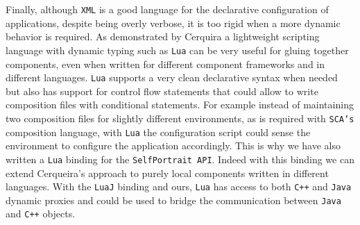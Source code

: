 Finally, although \texttt{XML} is a good language for the declarative configuration of applications, despite being overly verbose, it
is too rigid when a more dynamic behavior is required. As demonstrated by Cerquira \cite{Cerqueira00} a lightweight scripting language with
dynamic typing such as \texttt{Lua} \cite{Lua} can be very useful for gluing together components, even when written for different component
frameworks and in different languages. \texttt{Lua} supports a very clean declarative syntax when needed but also has support for control
flow statements that could allow to write composition files with conditional statements. For example instead of maintaining two
composition files for slightly different environments, as is required with \texttt{SCA's} composition language, with \texttt{Lua} the configuration
script could sense the environment to configure the application accordingly. This is why we have also written a \texttt{Lua} binding
for the \texttt{SelfPortrait API}. Indeed with this binding we can extend Cerqueira's approach to purely local components written
in different languages. With the \texttt{LuaJ} binding and ours, \texttt{Lua} has access to both \texttt{C++} and \texttt{Java} dynamic proxies and could
be used to bridge the communication between \texttt{Java} and \texttt{C++} objects.